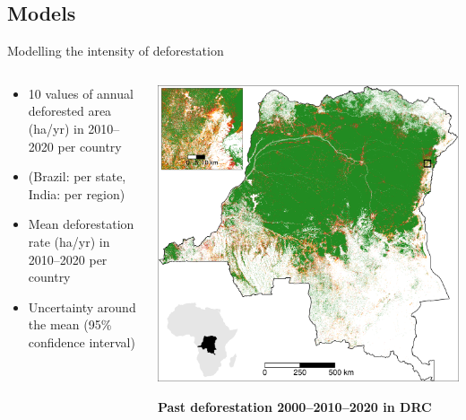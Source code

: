 \documentclass[10pt,table,dvipsnames,compress]{beamer}
\begin{document}
\subsection{Models}
\label{sec:orgeff6c1d}
\begin{frame}[label={sec:orgdcccb81}]{Modelling the intensity of deforestation}
\begin{columns}
\begin{column}{0.5\columnwidth}
\begin{itemize}
\item 10 values of annual deforested area (ha/yr) in 2010--2020 per country
\item (Brazil: per state, India: per region)
\item Mean deforestation rate (ha/yr) in 2010--2020 per country
\item Uncertainty around the mean (95\% confidence interval)
\end{itemize}
\end{column}

\begin{column}{0.5\columnwidth}
\includegraphics[width=\textwidth]{figs/sm/fcc123}

\textbf{Past deforestation 2000--2010--2020 in DRC}
\end{column}
\end{columns}
\end{frame}
\end{document}
